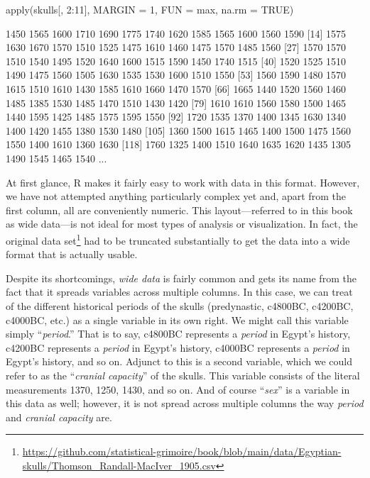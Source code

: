\begin{inR}
apply(skulls[, 2:11], MARGIN = 1, FUN = max, na.rm = TRUE)
\end{inR}

\begin{outR}
  [1] 1450 1565 1600 1710 1690 1775 1740 1620 1585 1565 1600 1560 1590
 [14] 1575 1630 1670 1570 1510 1525 1475 1610 1460 1475 1570 1485 1560
 [27] 1570 1570 1510 1540 1495 1520 1640 1600 1515 1590 1450 1740 1515
 [40] 1520 1525 1510 1490 1475 1560 1505 1630 1535 1530 1600 1510 1550
 [53] 1560 1590 1480 1570 1615 1510 1610 1430 1585 1610 1660 1470 1570
 [66] 1665 1440 1520 1560 1460 1485 1385 1530 1485 1470 1510 1430 1420
 [79] 1610 1610 1560 1580 1500 1465 1440 1595 1425 1485 1575 1595 1550
 [92] 1720 1535 1370 1400 1345 1630 1340 1400 1420 1455 1380 1530 1480
[105] 1360 1500 1615 1465 1400 1500 1475 1560 1550 1400 1610 1360 1630
[118] 1760 1325 1400 1510 1640 1635 1620 1435 1305 1490 1545 1465 1540
...
\end{outR}

At first glance, R makes it fairly easy to work with data in this format. However, we have not attempted anything particularly complex yet and, apart from the first column, all are conveniently numeric. This layout—referred to in this book as \gls{wide data}—is not ideal for most types of analysis or visualization. In fact, the original data set\footnote{\url{https://github.com/statistical-grimoire/book/blob/main/data/Egyptian-skulls/Thomson_Randall-MacIver_1905.csv}} had to be truncated substantially to get the data into a wide format that is actually usable.

Despite its shortcomings, \textit{wide data} is fairly common and gets its name from the fact that it spreads variables across multiple columns. In this case, we can treat of the different historical periods of the skulls (predynastic, c4800BC, c4200BC, c4000BC, etc.) as a single variable in its own right. We might call this variable simply ``\textit{period}.'' That is to say, c4800BC represents a \textit{period} in Egypt's history, c4200BC represents a \textit{period} in Egypt's history, c4000BC represents a \textit{period} in Egypt's history, and so on. Adjunct to this is a second variable, which we could refer to as the ``\textit{cranial capacity}'' of the skulls. This variable consists of the literal measurements 1370, 1250, 1430, and so on. And of course ``\textit{sex}'' is a variable in this data as well; however, it is not spread across multiple columns the way \textit{period} and \textit{cranial capacity} are. 

